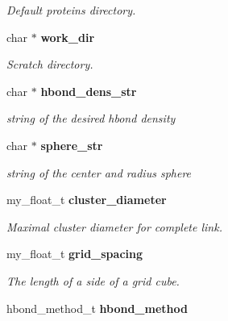 \begin{CompactItemize}
\begin{CompactList}\small\item\em Default proteins directory. \item\end{CompactList}\item 
char $\ast$ \bf{work\_\-dir}\label{structASCbase_1_1sitemap__variables__t_b4c8e92a25e8659139365e489cf7d5d3}

\begin{CompactList}\small\item\em Scratch directory. \item\end{CompactList}\item 
char $\ast$ \bf{hbond\_\-dens\_\-str}\label{structASCbase_1_1sitemap__variables__t_8d23a8f0fece77b6720972a9ccb38771}

\begin{CompactList}\small\item\em string of the desired hbond density \item\end{CompactList}\item 
char $\ast$ \bf{sphere\_\-str}\label{structASCbase_1_1sitemap__variables__t_9d1d9d528f2e67c292a79eb12d343f2b}

\begin{CompactList}\small\item\em string of the center and radius sphere \item\end{CompactList}\item 
my\_\-float\_\-t \bf{cluster\_\-diameter}\label{structASCbase_1_1sitemap__variables__t_e2234821022ddc0b1bfd001fbc29d035}

\begin{CompactList}\small\item\em Maximal cluster diameter for complete link. \item\end{CompactList}\item 
my\_\-float\_\-t \bf{grid\_\-spacing}\label{structASCbase_1_1sitemap__variables__t_90d5f33a206ea3f421bba55e2e72601b}

\begin{CompactList}\small\item\em The length of a side of a grid cube. \item\end{CompactList}\item 
hbond\_\-method\_\-t \bf{hbond\_\-method}\label{structASCbase_1_1sitemap__variables__t_8569b43e6c79f7a203cf8c6f47bf34c6}


\end{CompactItemize}
